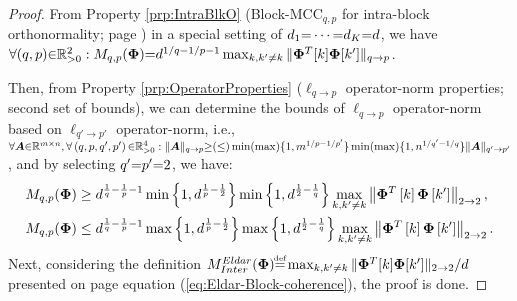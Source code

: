 \begin{proof}
From Property \ref{prp:IntraBlkO} (Block-MCC$_{q,p}$ for intra-block orthonormality; page \pageref{prp:IntraBlkO}) in a special setting of $d_1 {=} \cdots {=} d_K {=} d$, we have $\forall (q , p) {\in} \mathbb{R}^2_{{>} 0} : M_{q,p}(\boldsymbol{\Phi}) {{=}} d^{1/q {-} 1/p {-} 1} \max_{k,k' \neq k} \Vert \boldsymbol{\Phi}^T [k] \boldsymbol{\Phi} [k'] \Vert_{q \to p}$.
\iffalse
\begin{equation*}
M_{q,p}(\myPhi) = d^{\frac1q - \frac1p -1} \max_{k,k' \neq k} \mynorm{\myPhi^T \mybracket{k} \myPhi \mybracket{k'}}_{q \to p}.
\end{equation*}
\fi
Then, from Property \ref{prp:OperatorProperties} ($\ell_{q {\to} p}$ operator-norm properties; second set of bounds), we can determine the bounds of $\ell_{q {\to} p}$ operator-norm based on $\ell_{q' {\to} p'}$ operator-norm, i.e., $\forall \boldsymbol{A} {\in} \mathbb{R}^{m {\times} n}, \forall \left( q , p , q' , p' \right) {\in} \mathbb{R}^4_{>0} : \Vert \boldsymbol{A} \Vert_{q \to p} {\geq} ({\leq}) \min (\max) \{1 , m^{1/p {-} 1/{p'}} \} \min (\max) \{1 , n^{1/{q'} {-} 1/q} \} \Vert \boldsymbol{A} \Vert_{q' \to p'}$, and by selecting $q' {=} p' {=} 2$, we have:
\begin{gather*}
\begin{aligned}
&M_{q,p}(\boldsymbol{\Phi}) \geq d^{\frac1q - \frac1p -1} \min \left\lbrace 1 , d^{\frac1p - \frac{1}{2}} \right\rbrace \min \left\lbrace 1 , d^{\frac{1}{2} - \frac1q} \right\rbrace \max_{k,k' \neq k} \left\lVert\boldsymbol{\Phi}^T \left[ k \right] \boldsymbol{\Phi} \left[ k' \right]\right\rVert_{2 \to 2}, \\
&M_{q,p}(\boldsymbol{\Phi}) \leq d^{\frac1q - \frac1p -1} \max \left\lbrace 1 , d^{\frac1p - \frac{1}{2}} \right\rbrace \max \left\lbrace 1 , d^{\frac{1}{2} - \frac1q} \right\rbrace \max_{k,k' \neq k} \left\lVert\boldsymbol{\Phi}^T \left[ k \right] \boldsymbol{\Phi} \left[ k' \right]\right\rVert_{2 \to 2}.
\end{aligned}
\end{gather*}
Next, considering the definition $M^{Eldar}_{Inter}(\myPhi) {\myeq} \max_{k,k' \neq k} \Vert\myPhi ^T [k] \myPhi [k']\Vert_{2 \to 2}/d$ presented on page \pageref{eq:Eldar-Block-coherence} equation (\ref{eq:Eldar-Block-coherence}), the proof is done.
\end{proof}